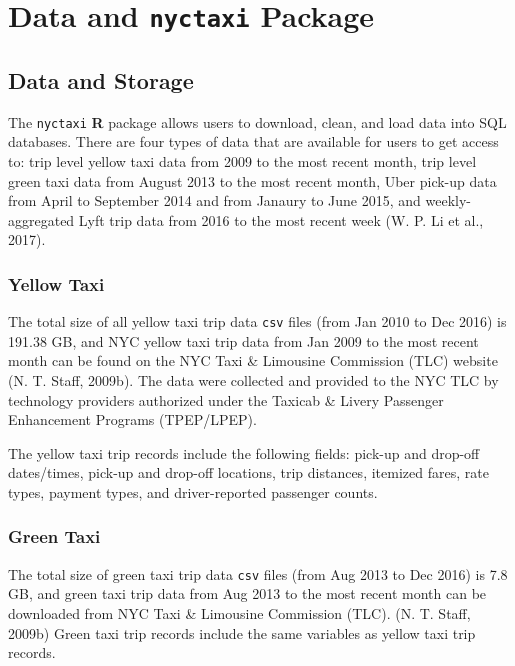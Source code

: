 \documentclass[12pt,twoside]{reedthesis}
\theoremstyle{definition}
\theoremstyle{definition}
\theoremstyle{definition}
\theoremstyle{remark}
\begin{document}
\chapter{\texorpdfstring{Data and \texttt{nyctaxi}
Package}{Data and nyctaxi Package}}\label{chapter2}

\section{Data and Storage}\label{data-and-storage}

The \texttt{nyctaxi} \textbf{R} package allows users to download, clean,
and load data into SQL databases. There are four types of data that are
available for users to get access to: trip level yellow taxi data from
2009 to the most recent month, trip level green taxi data from August
2013 to the most recent month, Uber pick-up data from April to September
2014 and from Janaury to June 2015, and weekly-aggregated Lyft trip data
from 2016 to the most recent week (W. P. Li et al., 2017).

\subsection{Yellow Taxi}\label{yellow-taxi-1}

The total size of all yellow taxi trip data \texttt{csv} files (from Jan
2010 to Dec 2016) is 191.38 GB, and NYC yellow taxi trip data from Jan
2009 to the most recent month can be found on the NYC Taxi \& Limousine
Commission (TLC) website (N. T. Staff, 2009b). The data were collected
and provided to the NYC TLC by technology providers authorized under the
Taxicab \& Livery Passenger Enhancement Programs (TPEP/LPEP).

The yellow taxi trip records include the following fields: pick-up and
drop-off dates/times, pick-up and drop-off locations, trip distances,
itemized fares, rate types, payment types, and driver-reported passenger
counts.

\subsection{Green Taxi}\label{green-taxi-1}

The total size of green taxi trip data \texttt{csv} files (from Aug 2013
to Dec 2016) is 7.8 GB, and green taxi trip data from Aug 2013 to the
most recent month can be downloaded from NYC Taxi \& Limousine
Commission (TLC). (N. T. Staff, 2009b) Green taxi trip records include
the same variables as yellow taxi trip records.
\end{document}
